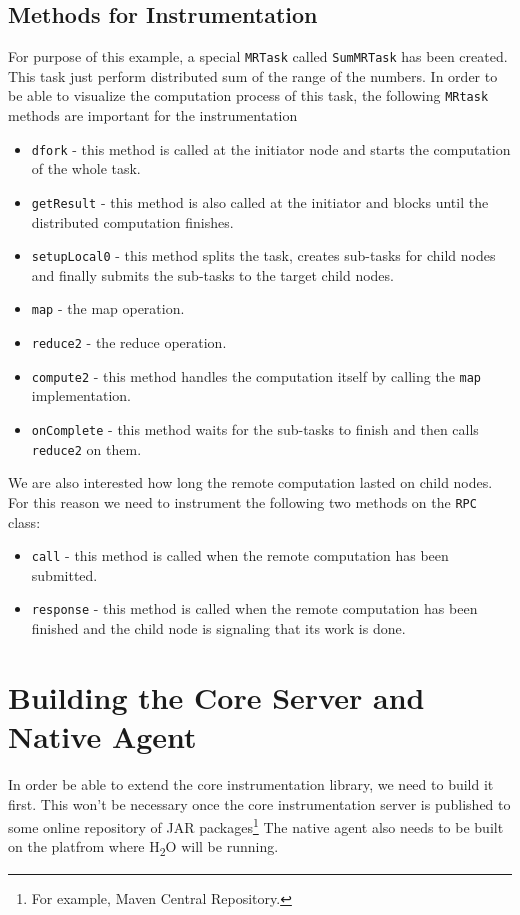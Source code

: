 \subsection{Methods for Instrumentation}
For purpose of this example, a special \texttt{MRTask} called \texttt{SumMRTask} has been created. This task just perform distributed sum of the range of the numbers. In order to be able to visualize the computation process of this task, the following \texttt{MRtask} methods are important for the instrumentation
\begin{itemize}
	\item \texttt{dfork} - this method is called at the initiator node and starts the computation of the whole task.
	\item \texttt{getResult} - this method is also called at the initiator and blocks until the distributed computation finishes.
	\item \texttt{setupLocal0} - this method splits the task, creates sub-tasks for child nodes and finally submits the sub-tasks to the target child nodes.
	\item \texttt{map} - the map operation.
	\item \texttt{reduce2} - the reduce operation.
	\item \texttt{compute2} - this method handles the computation itself by calling the \texttt{map} implementation.
	\item \texttt{onComplete} - this method waits for the sub-tasks to finish and then calls \texttt{reduce2} on them.
\end{itemize}

We are also interested how long the remote computation lasted on child nodes. For this reason we need to instrument the following two methods on the \texttt{RPC} class:
\begin{itemize}
	\item \texttt{call} - this method is called when the remote computation has been submitted.
	\item \texttt{response} - this method is called when the remote computation has been finished and the child node is signaling that its work is done.
\end{itemize}

\section{Building the Core Server and Native Agent}
In order be able to extend the core instrumentation library, we need to build it first. This won't be necessary once the core instrumentation server is published to some online repository of JAR packages\footnote{For example, Maven Central Repository.} The native agent also needs to be built on the platfrom where H\textsubscript{2}O will be running.

